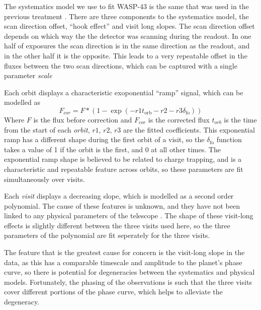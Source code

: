 \documentclass[a4paper,fleqn,usenatbib]{mnras}
\begin{document}
The systematics model we use to fit WASP-43 is the same that was used in the previous treatment \citep{Stevenson2014}. There are three components to the systematics model, the scan direction offset, ``hook effect'' and visit long slopes. The scan direction offset depends on which way the the detector was scanning during the readout. In one half of exposures the scan direction is in the same direction as the readout, and in the other half it is the opposite. This leads to a very repeatable offset in the fluxes between the two scan directions, which can be captured with a single parameter \emph{scale}

Each orbit displays a characteristic exoponential ``ramp'' signal, which can be modelled as
\begin{equation} \label{eq:hook}
F_{cor} = F*(1-\exp(-r1 t_\mathrm{orb}-r2-r3 \delta_\mathrm{fo}))
\end{equation}
Where $F$ is the flux before correction and $F_{cor}$ is the corrected flux $t_{orb}$ is the time from the start of each \emph{orbit}, $r1$, $r2$, $r3$ are the fitted coefficients. This exponential ramp has a different shape during the first orbit of a visit, so the $\delta_\mathrm{fo}$ function takes a value of 1 if the orbit is the first, and 0 at all other times. The exponential ramp shape is believed to be related to charge trapping, and is a characteristic and repeatable feature across orbits, so these parameters are fit simultaneously over visits.

Each \emph{visit} displays a decreasing slope, which is modelled as a second order polynomial. The cause of these features is unknown, and they have not been linked to any physical parameters of the telescope \citep{Wakeford2016}. The shape of these visit-long effects is slightly different between the three visits used here, so the three parameters of the polynomial are fit seperately for the three visits.

The feature that is the greatest cause for concern is the visit-long slope in the data, as this has a comparable timescale and amplitude to the planet's phase curve, so there is potential for degeneracies between the systematics and physical models. Fortunately, the phasing of the observations is such that the three visits cover different portions of the phase curve, which helps to alleviate the degeneracy.
\end{document}
